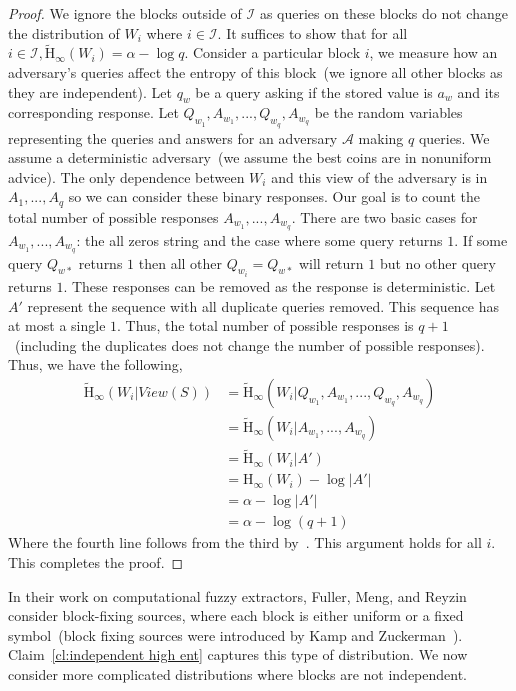 \documentclass[11pt]{article}
\newcommand{\clref}[1]{\mbox{Claim~\ref{#1}}}
\newcommand{\Hoo}{\mathrm{H}_\infty}
\newcommand{\Hav}{\tilde{\mathrm{H}}_\infty}
\begin{document}
\begin{proof}
We ignore the blocks outside of $\mathcal{I}$ as queries on these blocks do not change the distribution of $W_i$ where $i\in \mathcal{I}$.  It suffices to show that for all $i\in \mathcal{I}, \Hav(W_i) = \alpha -\log q$.  
Consider a particular block $i$, we measure how an adversary's queries affect the entropy of this block~(we ignore all other blocks as they are independent).  
Let $q_w$ be a query asking if the stored value is $a_w$ and its corresponding response.  
Let $Q_{w_1},A_{w_1},..., Q_{w_q}, A_{w_q}$ be the random variables representing the queries and answers for an  adversary $\mathcal{A}$ making $q$ queries.  We assume a deterministic adversary~(we assume the best coins are in nonuniform advice).  The only dependence between $W_i$ and this view of the adversary is in $A_1,..., A_q$ so we can consider these binary responses.  Our goal is to count the total number of possible responses $A_{w_1},..., A_{w_q}$.  There are two basic cases for $A_{w_1},..., A_{w_q}$: the all zeros string and the case where some query returns $1$.  If some query $Q_{w*}$ returns $1$ then all other $Q_{w_i} = Q_{w*}$ will return $1$ but no other query returns $1$.  These responses can be removed as the response is deterministic.  Let $A'$ represent the sequence with all duplicate queries removed.  This sequence has at most a single $1$.  Thus, the total number of possible responses is $q+1$~(including the duplicates does not change the number of possible responses).  Thus, we have the following,
\begin{align*}
\Hav(W_i | View(S)) &= \Hav(W_i| Q_{w_1}, A_{w_1},..., Q_{w_q}, A_{w_q})\\
&=\Hav(W_i | A_{w_1},..., A_{w_q})\\
&=\Hav(W_i |A') \\
&=\Hoo(W_i) - \log |A'|\\
&=\alpha - \log |A'|\\
&=\alpha - \log (q+1)
\end{align*}
Where the fourth line follows from the third by~\cite[Lemma 2.2]{DBLP:journals/siamcomp/DodisORS08}.
This argument holds for all $i$.  This completes the proof.
\end{proof}
In their work on computational fuzzy extractors, Fuller, Meng, and Reyzin~\cite{fuller2013computational} consider block-fixing sources, where each block is either uniform or a fixed symbol~(block fixing sources were introduced by Kamp and Zuckerman~\cite{KZ07}).  \clref{cl:independent high ent} captures this type of distribution.  
We now consider more complicated distributions where blocks are not independent.  
\end{document}
